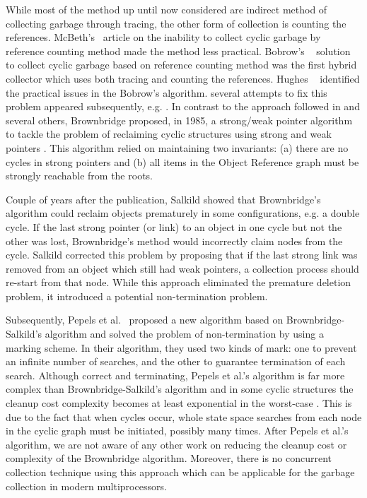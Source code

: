  While most of the method up until now considered are  indirect method of collecting garbage through tracing, the other form of collection is counting the references. McBeth's~\cite{McBeth1963} article on the inability to collect cyclic garbage  by 
 reference counting method made the method less practical. Bobrow's ~\cite{Bobrow1980} solution to collect cyclic garbage based on reference counting method was the first hybrid collector which uses both tracing and
counting the references. Hughes ~\cite{hugh83,hugh87} identified the practical issues in the Bobrow's algorithm.
several attempts to fix this problem appeared subsequently, e.g. \cite{Friedman1979,Bobrow1980,Lins2008}. 
In contrast to the approach followed in \cite{Friedman1979,Bobrow1980,Lins2008} and several others,
Brownbridge \cite{Brownbridge1985} proposed, in 1985, a strong/weak pointer algorithm to tackle the problem of reclaiming cyclic  structures using strong and weak pointers \cite{Jones1996}. 
This algorithm relied on maintaining two invariants: (a) there are no cycles in strong pointers and (b) all items in the Object Reference graph must be strongly reachable from the roots.

Couple of years after the publication, Salkild \cite{Salkild1987} showed that Brownbridge's algorithm
\cite{Brownbridge1985} could reclaim objects prematurely in some
configurations, e.g. a double cycle. If the last strong pointer (or link) to
an object in one cycle but not the other was lost, Brownbridge's
method would incorrectly claim nodes from the cycle.
Salkild \cite{Salkild1987} corrected this problem by proposing
that if the last strong link was removed from an object which still
had weak pointers, a collection process should re-start from that node.
While this approach eliminated the premature deletion problem, it introduced a
potential non-termination problem.

Subsequently, Pepels et al.~\cite{Pepels1988} proposed a new algorithm based on
Brownbridge-Salkild's algorithm and solved the problem of non-termination by
using a marking scheme. In their algorithm, they used two kinds of mark: one to
prevent an infinite number of searches, and the other to guarantee termination
of each search. Although correct and terminating, Pepels et al.'s algorithm is far more
complex than Brownbridge-Salkild's algorithm and in some cyclic structures the
cleanup cost complexity becomes at least
exponential in the worst-case \cite{Jones1996}. This is due to the fact that when
cycles occur, whole state space searches from
each node in the cyclic graph must be initiated, possibly many times. After Pepels et al.'s algorithm, we are not aware
of any other work on reducing the cleanup cost or complexity of the Brownbridge
algorithm. Moreover, there is no concurrent collection technique using this approach which can be applicable for the garbage collection in modern multiprocessors.

